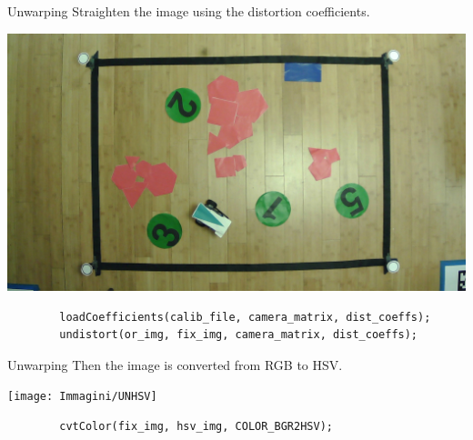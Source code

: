 \begin{frame}[fragile]{Unwarping}
	Straighten the image using the distortion coefficients. 
	\begin{center}
		\includegraphics[scale=0.15]{Immagini/UNUndistort}	
	\end{center}
	\begin{verbatim}
		loadCoefficients(calib_file, camera_matrix, dist_coeffs);
		undistort(or_img, fix_img, camera_matrix, dist_coeffs);
	\end{verbatim}
\end{frame}

\begin{frame}[fragile]{Unwarping}
	Then the image is converted from RGB to HSV.
	\begin{center}
		\texttt{[image: Immagini/UNHSV]}
	\end{center}
	\vfill
	\begin{verbatim}
		cvtColor(fix_img, hsv_img, COLOR_BGR2HSV);
	\end{verbatim}
	\vfill
\end{frame}


